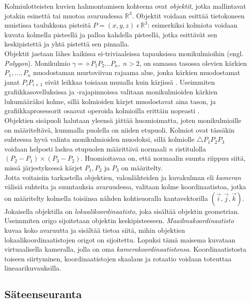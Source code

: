 \documentclass[a4paper, 12pt, titlepage]{article}
\newcommand{\R}{\mathbb{R}}
\begin{document}
Kolmiulotteisten kuvien hahmontamisen kohteena ovat \emph{objektit}, jotka mallintavat jotakin esinettä tai muotoa avaruudessa $\R^3$. Objektit voidaan esittää tietokoneen muistissa taulukkona pisteitä $P=(x,y,z)\;\epsilon\,\R^3$: esimerkiksi kolmiota voidaan kuvata kolmella pisteellä ja palloa kahdella pisteellä, jotka esittävät sen keskipistettä ja yhtä pistettä sen pinnalla. \citep[.]{angel}\\

Objektit jaetaan lähes kaikissa ei-triviaaleissa tapauksissa monikulmioihin (engl. \emph{Polygon}). Monikulmio $\gamma = \diamond P_1P_2...P_n, \; n > 2$, on samassa tasossa olevien kärkien $P_1,...,P_n$ muodostaman murtoviivan rajaama alue, jonka kärkien muodostamat janat $P_i P_{i+1}$ eivät leikkaa toisiaan muualla kuin kärjissä \citep{harju}. Useimmiten grafiikkasovelluksissa ja -rajapinnoissa valitaan monikulmioiden kärkien lukumääräksi kolme, sillä kolmioiden kärjet muodostavat aina tason, ja grafiikkaprosessorit osaavat operoida kolmioilla erittäin nopeasti \citep{angel}.\\

Objektien sisäpuoli halutaan yleensä jättää huomioimatta, joten monikulmioille on määriteltävä, kummalla puolella on niiden etupuoli. Kolmiot ovat tässäkin suhteessa hyvä valinta monikulmioiden muodoksi, sillä kolmiolle $\triangle P_1P_2P_3$ voidaan helposti laskea etupuolen määrittävä normaali $n$ ristitulolla $(P_2-P_1) \times (P_3-P_2)$. Huomioitavaa on, että normaalin suunta riippuu siitä, missä järjestyksessä kärjet $P_1, P_2$ ja $P_3$ on määritelty. \citep[.]{hughes}\\

Jotta voitaisiin tarkastella objektien, valonlähteiden ja kuvakulman eli \emph{kameran} välisiä suhteita ja suuntauksia avaruudessa, valitaan kolme koordinaatistoa, jotka on määritelty kolmella toisiinsa nähden kohtisuoralla kantavektorilla $(\vec{i},\vec{j},\vec{k})$. Jokaisella objektilla on \emph{lokaalikoordinaatisto}, joka sisältää objektin geometrian. Useimmiten origo sijoitetaan objektin keskipisteeseen. \emph{Maailmakoordinaatisto} kuvaa koko avaruutta ja sisältää tietoa siitä, mihin objektien lokaalikoordinaatistojen origot on sijoitettu. Lopuksi tämä maisema kuvataan virtuaalisella kameralla, jolla on oma \emph{kamerakoordinaatistonsa}. Koordinaatistosta toiseen siirtyminen, koordinaatistojen skaalaus ja rotaatio voidaan toteuttaa lineaarikuvauksilla. \citep[.]{janke}

\subsection{Säteenseuranta}
\end{document}

